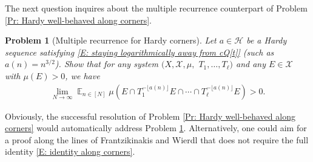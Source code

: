 \documentclass[11pt]{amsart}
\newtheorem{problem}{Problem}
\theoremstyle{definition}
\DeclareMathOperator*{\E}{\mathbb{E}}
\newcommand{\R}{{\mathbb R}}
\newcommand{\Z}{{\mathbb Z}}
\newcommand{\CH}{{\mathcal H}}
\newcommand{\CX}{{\mathcal X}}
\newcommand{\1}{{\mathbf{1}}}
\newcommand{\sfloor}[1]{{\lfloor #1 \rfloor}}
\begin{document}
The next question inquires about the multiple recurrence counterpart of Problem \ref{Pr: Hardy well-behaved along corners}.
\begin{problem}[Multiple recurrence for Hardy corners]\label{Pr: multiple recurrence for Hardy corners}
    Let $a\in\CH$ be a Hardy sequence satisfying \eqref{E: staying logarithmically away from cQ[t]} (such as $a(n) = n^{3/2}$). Show that for any system $(X, \CX, \mu,$\! $T_1, \ldots, T_\ell)$ and any $E\in\CX$ with $\mu(E)>0$, we have
    \begin{align*}
       \lim_{N\to\infty}\E_{n\in [N]}\mu(E\cap T_1^{-\sfloor{a(n)}}E\cap \cdots \cap T_\ell^{-\sfloor{a(n)}}E)>0.
    \end{align*}
\end{problem}
Obviously, the successful resolution of Problem \ref{Pr: Hardy well-behaved along corners} would automatically address Problem \ref{Pr: multiple recurrence for Hardy corners}. Alternatively, one could aim for a proof along the lines of Frantzikinakis and Wierdl \cite{FrW09} that does not require the full identity \eqref{E: identity along corners}.
%
\end{document}

